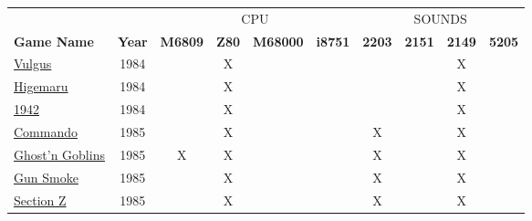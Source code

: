 \begin{figure}[H]
{ 
\setlength{\tabcolsep}{3.0pt}
\setlength\cmidrulewidth{\heavyrulewidth} %
\begin{tabularx}{\textwidth}{Xccccccccc}

  & & \multicolumn{4}{c}{CPU} &  \multicolumn{4}{c}{SOUNDS} \\
  \cmidrule(lr){3-6}
  \cmidrule(lr){7-10}
 
  \textbf{Game Name} & \textbf{Year} & \textbf{M6809} & \textbf{Z80} & \textbf{M68000} & \textbf{i8751} & \textbf{2203} & \textbf{2151} & \textbf{2149} & \textbf{5205} \\               
  \toprule    
\href{https://www.youtube.com/watch?v=45ELzG1ivEA}{Vulgus}
                & 1984          &               &      X       &              &              &               &               &       X       &               \\
\href{https://www.youtube.com/watch?v=R5mg6XPqtBs}{Higemaru}
                & 1984          &               &      X       &              &              &               &               &       X       &               \\
\href{https://www.youtube.com/watch?v=Em7UwOOBvlA}{1942}
                & 1984          &               &      X       &              &              &               &               &       X       &               \\
  \toprule    
\href{https://www.youtube.com/watch?v=1qctKI_t5eY}{Commando}
                & 1985          &               &      X       &              &              &       X       &               &       X       &               \\
\href{https://www.youtube.com/watch?v=SugLAqaPhqA}{Ghost'n Goblins}  
                & 1985          &       X       &      X       &              &              &       X       &               &       X       &               \\
\href{https://www.youtube.com/watch?v=mrO9qwGXdy8}{Gun Smoke}        
                & 1985          &               &      X       &              &              &       X       &               &       X       &               \\
\href{https://www.youtube.com/watch?v=cIC2mNNryZg}{Section Z}
                & 1985          &               &      X       &              &              &       X       &               &       X       &               \\

\end{tabularx}}
\end{figure}
